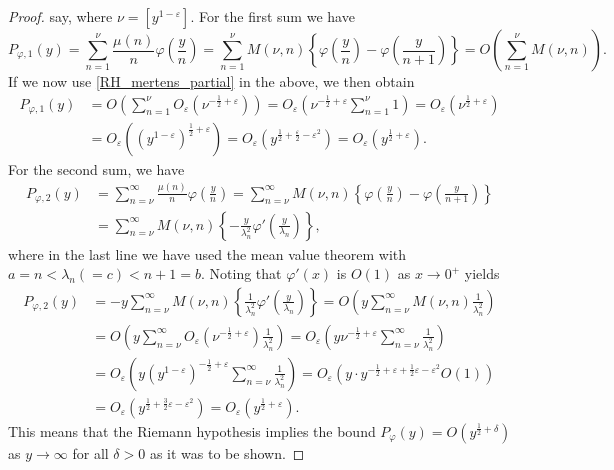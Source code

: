 \documentclass[11pt]{article}
\numberwithin{equation}{section}		 			%
\numberwithin{figure}{section}			 			%
\begin{document}
\begin{proof}
say, where $\nu  = [{y^{1 - \varepsilon }}]$. For the first sum we have
\[{P_{\varphi ,1}}(y) = \sum\limits_{n = 1}^\nu  {\frac{{\mu (n)}}{n}\varphi \left( {\frac{y}{n}} \right)}  = \sum\limits_{n = 1}^\nu  {M(\nu ,n)\left\{ {\varphi \left( {\frac{y}{n}} \right) - \varphi \left( {\frac{y}{{n + 1}}} \right)} \right\}}  = O\left( {\sum\limits_{n = 1}^\nu  {M(\nu ,n)} } \right).\]
If we now use \eqref{RH_mertens_partial} in the above, we then obtain
\begin{align}
  {P_{\varphi ,1}}(y) &= O\left( {\sum\limits_{n = 1}^\nu  {{O_\varepsilon }({\nu ^{ - \tfrac{1}{2} + \varepsilon }})} } \right) = {O_\varepsilon }\left( {{\nu ^{ - \tfrac{1}{2} + \varepsilon }}\sum\limits_{n = 1}^\nu  1 } \right) = {O_\varepsilon }({\nu ^{\tfrac{1}{2} + \varepsilon }}) \nonumber \\
   &= {O_\varepsilon }({({y^{1 - \varepsilon }})^{\tfrac{1}{2} + \varepsilon }}) = {O_\varepsilon }({y^{\tfrac{1}{2} + \tfrac{\varepsilon }{2} - {\varepsilon ^2}}}) = {O_\varepsilon }({y^{\tfrac{1}{2} + \varepsilon }}). \nonumber 
\end{align}
For the second sum, we have
\begin{align}
  {P_{\varphi ,2}}(y) &= \sum\limits_{n = \nu }^\infty  {\frac{{\mu (n)}}{n}\varphi \left( {\frac{y}{n}} \right)}  = \sum\limits_{n = \nu }^\infty  {M(\nu ,n)\left\{ {\varphi \left( {\frac{y}{n}} \right) - \varphi \left( {\frac{y}{{n + 1}}} \right)} \right\}}  \nonumber \\
   &= \sum\limits_{n = \nu }^\infty  {M(\nu ,n)\left\{ { - \frac{y}{{\lambda _n^2}}\varphi '\left( {\frac{y}{{{\lambda _n}}}} \right)} \right\}},  \nonumber 
\end{align}
where in the last line we have used the mean value theorem with $a=n < \lambda_n (=c) < n+1=b$. Noting that $\varphi'(x)$ is $O(1)$ as $x \to 0^+$ yields
\begin{align}
  {P_{\varphi ,2}}(y)  &=  - y\sum\limits_{n = \nu }^\infty  {M(\nu ,n)\left\{ {\frac{1}{{\lambda _n^2}}\varphi '\left( {\frac{y}{{{\lambda _n}}}} \right)} \right\}}  = O\left( {y\sum\limits_{n = \nu }^\infty  {M(\nu ,n)\frac{1}{{\lambda _n^2}}} } \right) \nonumber \\
   &= O\left( {y\sum\limits_{n = \nu }^\infty  {{O_\varepsilon }({\nu ^{ - \tfrac{1}{2} + \varepsilon }})\frac{1}{{\lambda _n^2}}} } \right) = {O_\varepsilon }\left( {y{\nu ^{ - \tfrac{1}{2} + \varepsilon }}\sum\limits_{n = \nu }^\infty  {\frac{1}{{\lambda _n^2}}} } \right) \nonumber \\
   &= {O_\varepsilon }\left( {y{{({y^{1 - \varepsilon }})}^{ - \tfrac{1}{2} + \varepsilon }}\sum\limits_{n = \nu }^\infty  {\frac{1}{{\lambda _n^2}}} } \right) = {O_\varepsilon }(y \cdot {y^{ - \tfrac{1}{2} + \varepsilon  + \tfrac{1}{2}\varepsilon  - {\varepsilon ^2}}}O(1)) \nonumber \\
   &= {O_\varepsilon }({y^{\tfrac{1}{2} + \tfrac{3}{2}\varepsilon  - {\varepsilon ^2}}}) = {O_\varepsilon }({y^{\tfrac{1}{2} + \varepsilon }}). \nonumber 
\end{align}
This means that the Riemann hypothesis implies the bound ${P_\varphi }(y) = O({y^{\tfrac{1}{2} + \delta }})$ as $y \to \infty$ for all $\delta >0$ as it was to be shown.
\end{proof}
\end{document}
